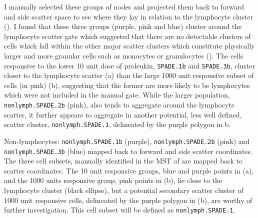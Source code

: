 I manually selected these groups of nodes and projected them back to forward and side scatter space to see where they lay in relation
to the lymphocyte cluster ().  
I found that these three groups (purple, pink and blue) cluster around the lymphocyte scatter gate which suggested that there are no detectable clusters of cells which fall within the other major scatter clusters which constitute physically larger and more granular cells such as monocytes or granulocytes ().
The cells responsive to the lower 10 unit dose of proleukin, \texttt{SPADE.1b} and \texttt{SPADE.3b}, cluster closer to the lymphocyte scatter (a) than the large 1000 unit responsive subset of cells (in pink) (b), suggesting that the former are more likely to be lymphocytes which were not included in the manual gate.
While the larger population, \texttt{nonlymph.SPADE.2b} (pink), also tends to aggregate around the lymphocyte scatter, it further appears to aggregate in another potential, less well defined, scatter cluster, \texttt{nonlymph.SPADE.1}, delineated by the purple polygon in b.

{
 Non-lymphocytes: \texttt{nonlymph.SPADE.1b} (purple), \texttt{nonlymph.SPADE.2b} (pink) and \texttt{nonlymph.SPADE.3b} (blue) mapped back to forward and side scatter coordinates.
}
{
 The three cell subsets, manually identified in the \gls{MST} of  are mapped back to scatter coordinates.
 The 10 unit responsive groups, blue and purple points in (a), and the 1000 units responsive group, pink points in (b), lie close to the lymphocyte cluster (black ellipse), but a potential secondary scatter cluster of 1000 unit responsive cells, delineated by the purple polygon in (b), are worthy of further investigation.
 This cell subset will be defined as \texttt{nonlymph.SPADE.1}.
}

